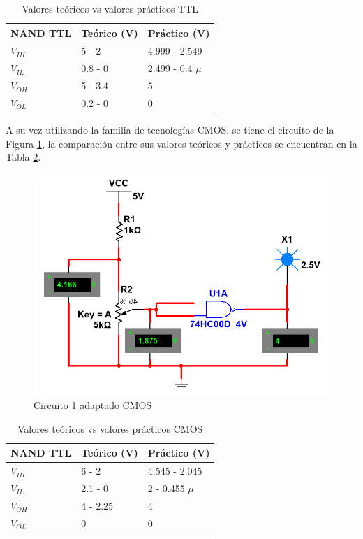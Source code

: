 \documentclass[journal]{IEEEtran}
\begin{document}
	\begin{table}[htb]
		\centering
		\begin{tabular}{lll}
			\hline
			NAND TTL  & Teórico (V) & Práctico (V)  \\
			\hline
			$V_{IH}$ & 5 - 2    & 4.999 - 2.549 \\
			$V_{IL}$ & 0.8 - 0  & 2.499 - 0.4 $\mu$ \\
			$V_{OH}$ & 5 - 3.4 & 5 \\
			$V_{OL}$ & 0.2 - 0  & 0 \\
		\end{tabular}
		\caption{Valores teóricos vs valores prácticos TTL}
		\label{tab:TvPTTL}
	\end{table}
	
	
	A su vez utilizando la familia de tecnologías CMOS, se tiene el circuito de la Figura \ref{fig:CMOSC1}, la comparación entre sus valores teóricos y prácticos se encuentran en la Tabla \ref{tab:TvPCMOS}.
	
	\begin{figure}[htb]
		\centering
		\includegraphics[scale = 0.4]{img/CMOSC1.png}
		\caption{Circuito 1 adaptado CMOS}
		\label{fig:CMOSC1}
	\end{figure}
	
	\begin{table}[htb]
		\centering
		\begin{tabular}{lll}
			\hline
			NAND TTL  & Teórico (V) & Práctico (V)  \\
			\hline
			$V_{IH}$ & 6 - 2    & 4.545 - 2.045 \\
			$V_{IL}$ & 2.1 - 0  & 2 - 0.455 $\mu$ \\
			$V_{OH}$ & 4 - 2.25 & 4 \\
			$V_{OL}$ & 0  & 0 \\
		\end{tabular}
		\caption{Valores teóricos vs valores prácticos CMOS}
		\label{tab:TvPCMOS}
	\end{table}
	
\end{document}
